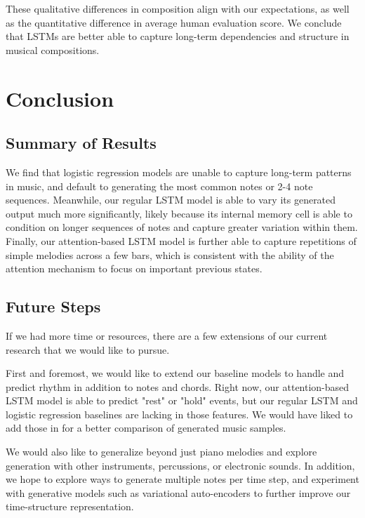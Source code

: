 \documentclass[twoside,twocolumn]{article}
\begin{document}
These qualitative differences in composition align with our expectations, as well as the quantitative difference in average human
evaluation score. We conclude that LSTMs are better able to capture long-term dependencies and structure in musical compositions.




\section{Conclusion}

\subsection{Summary of Results}

We find that logistic regression models are unable to capture long-term patterns in music, and default to generating the most common notes or 2-4 note sequences. Meanwhile, our regular LSTM model is able to vary its generated output much more significantly, likely because its internal memory cell is able to condition on longer sequences of notes and capture greater variation within them. Finally, our attention-based LSTM model is further able to capture repetitions of simple melodies across a few bars, which is consistent with the ability of the attention mechanism to focus on important previous states. 


\subsection{Future Steps}
If we had more time or resources, there are a few extensions of our current research that we would like to pursue. 

First and foremost, we would like to extend our baseline models to handle and predict rhythm in addition to notes and chords. Right now, our attention-based LSTM model is able to predict "rest" or "hold" events, but our regular LSTM and logistic regression baselines are lacking in those features. We would have liked to add those in for a better comparison of generated music samples. 

We would also like to generalize beyond just piano melodies and explore generation with
other instruments, percussions, or electronic sounds. In addition, we hope to
explore ways to generate multiple notes per time step, and experiment with generative models such as variational auto-encoders to further improve our time-structure
representation.
\end{document}

